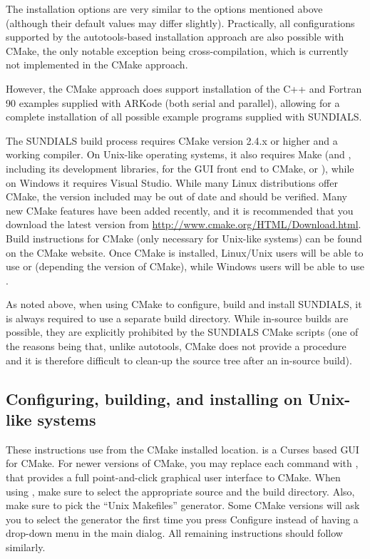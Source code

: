\documentclass[letterpaper,10pt,english]{sphinxmanual}
\begin{document}
The installation options are very similar to the options mentioned
above (although their default values may differ
slightly).  Practically, all configurations supported by the
autotools-based installation approach are also possible with CMake,
the only notable exception being cross-compilation, which is currently
not implemented in the CMake approach.

However, the CMake approach does support installation of the C++ and
Fortran 90 examples supplied with ARKode (both serial and parallel),
allowing for a complete installation of all possible example programs
supplied with SUNDIALS.

The SUNDIALS build process requires CMake version 2.4.x or higher and
a working compiler.  On Unix-like operating systems, it also requires
Make (and , including its development libraries, for the GUI
front end to CMake,  or ), while on Windows it
requires Visual Studio.  While many Linux distributions offer CMake,
the version included may be out of date and should be verified.  Many
new CMake features have been added recently, and it is recommended
that you download the latest version from
\href{http://www.cmake.org/HTML/Download.html}{http://www.cmake.org/HTML/Download.html}.  Build instructions for
CMake (only necessary for Unix-like systems) can be found on the CMake
website. Once CMake is installed, Linux/Unix users will be able to use
 or  (depending the version of CMake), while
Windows users will be able to use .

As noted above, when using CMake to configure, build and install
SUNDIALS, it is always required to use a separate build
directory.  While in-source builds are possible, they are explicitly
prohibited by the SUNDIALS CMake scripts (one of the reasons being
that, unlike autotools, CMake does not provide a 
procedure and it is therefore difficult to clean-up the source tree
after an in-source build).


\subsection{Configuring, building, and installing on Unix-like systems}
\label{Install:index-31}\label{Install:configuring-building-and-installing-on-unix-like-systems}
These instructions use  from the CMake installed
location.  is a Curses based GUI for CMake.
For newer versions of CMake, you may replace each  command
with , that provides a full point-and-click graphical
user interface to CMake.  When using , make sure to
select the appropriate source and the build directory.  Also, make
sure to pick the ``Unix Makefiles'' generator.  Some CMake versions will
ask you to select the generator the first time you press Configure
instead of having a drop-down menu in the main dialog.  All remaining
instructions should follow similarly.
\end{document}
